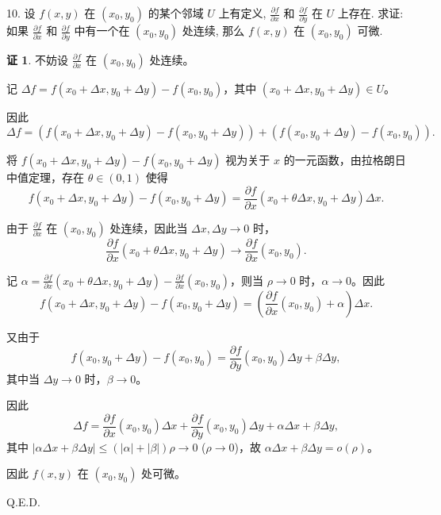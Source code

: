 \documentclass[a4paper,12pt]{article}
\theoremstyle{definition}
\newtheorem*{pf}{证}
\begin{document}
10. 设 $f(x,y)$ 在 $(x_0,y_0)$ 的某个邻域 $U$ 上有定义, $\frac{\partial f}{\partial x}$ 和 $\frac{\partial f}{\partial y}$ 在 $U$ 上存在. 求证: 如果 $\frac{\partial f}{\partial x}$ 和 $\frac{\partial f}{\partial y}$ 中有一个在 $(x_0,y_0)$ 处连续, 那么 $f(x,y)$ 在 $(x_0,y_0)$ 可微.
\begin{pf}
    不妨设 $\frac{\partial f}{\partial x}$ 在 $(x_0,y_0)$ 处连续。

    记 $\Delta f=f(x_0+\Delta x,y_0+\Delta y)-f(x_0,y_0)$，其中 $(x_0+\Delta x,y_0+\Delta y)\in U$。

    因此
    $$
        \Delta f = (f(x_0+\Delta x, y_0+\Delta y) - f(x_0, y_0+\Delta y)) + (f(x_0, y_0+\Delta y) - f(x_0, y_0)).
    $$

    将 $f(x_0+\Delta x, y_0+\Delta y) - f(x_0, y_0+\Delta y)$ 视为关于 $x$ 的一元函数，由拉格朗日中值定理，存在 $\theta\in(0,1)$ 使得
    $$
        f(x_0+\Delta x, y_0+\Delta y) - f(x_0, y_0+\Delta y) = \frac{\partial f}{\partial x}(x_0+\theta\Delta x, y_0+\Delta y) \Delta x.
    $$

    由于 $\frac{\partial f}{\partial x}$ 在 $(x_0,y_0)$ 处连续，因此当 $\Delta x,\Delta y\to 0$ 时，
    $$
        \frac{\partial f}{\partial x}(x_0+\theta\Delta x, y_0+\Delta y)\to\frac{\partial f}{\partial x}(x_0, y_0).
    $$

    记 $\alpha=\frac{\partial f}{\partial x}(x_0+\theta\Delta x, y_0+\Delta y)-\frac{\partial f}{\partial x}(x_0, y_0)$，则当 $\rho\to 0$ 时，$\alpha\to 0$。因此
    $$
        f(x_0+\Delta x, y_0+\Delta y) - f(x_0, y_0+\Delta y) =\left(\frac{\partial f}{\partial x}(x_0, y_0) + \alpha\right) \Delta x.
    $$

    又由于
    $$
        f(x_0, y_0+\Delta y) - f(x_0, y_0) = \frac{\partial f}{\partial y}(x_0, y_0) \Delta y + \beta \Delta y,
    $$
    其中当 $\Delta y\to 0$ 时，$\beta\to 0$。

    因此
    $$
        \Delta f = \frac{\partial f}{\partial x}(x_0, y_0) \Delta x + \frac{\partial f}{\partial y}(x_0, y_0) \Delta y + \alpha \Delta x + \beta \Delta y,
    $$
    其中 $|\alpha \Delta x + \beta \Delta y|\leq(|\alpha|+|\beta|)\rho\to 0$ ($\rho\to 0$)，故 $\alpha \Delta x + \beta \Delta y = o(\rho)$。

    因此 $f(x,y)$ 在 $(x_0,y_0)$ 处可微。

    Q.E.D.
\end{pf}
\end{document}
